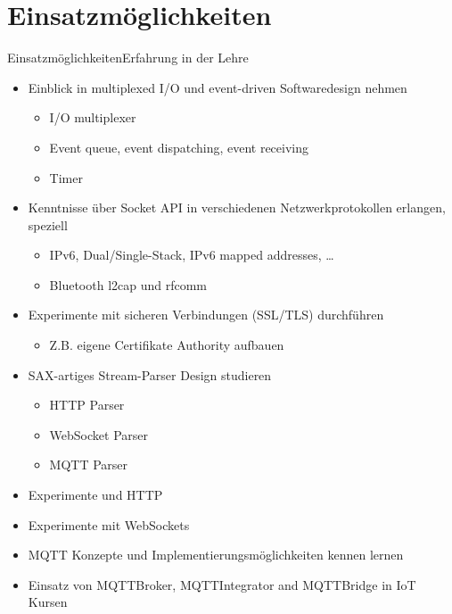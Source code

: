 ﻿

\part[nopartpage]{Einsatzmöglichkeiten}
\begin{frame}{Einsatzmöglichkeiten}{Erfahrung in der Lehre}
  \begin{itemize}
    \item Einblick in multiplexed I/O und event-driven Softwaredesign nehmen
    \begin{itemize}
      \item I/O multiplexer
      \item Event queue, event dispatching, event receiving
      \item Timer
    \end{itemize}
    \item Kenntnisse über Socket API in verschiedenen Netzwerkprotokollen erlangen, speziell
    \begin{itemize}
      \item IPv6, Dual/Single-Stack, IPv6 mapped addresses, \ldots
      \item Bluetooth l2cap und rfcomm
    \end{itemize}
    \item Experimente mit sicheren Verbindungen (SSL/TLS) durchführen
    \begin{itemize}
      \item Z.B. eigene Certifikate Authority aufbauen
    \end{itemize}
    \item SAX-artiges Stream-Parser Design studieren
    \begin{itemize}
      \item HTTP Parser
      \item WebSocket Parser
      \item MQTT Parser
    \end{itemize}
    \item Experimente und HTTP
    \item Experimente mit WebSockets
    \item MQTT Konzepte und Implementierungsmöglichkeiten kennen lernen
    \item Einsatz von MQTTBroker, MQTTIntegrator and MQTTBridge in IoT Kursen
  \end{itemize}
\end{frame}
